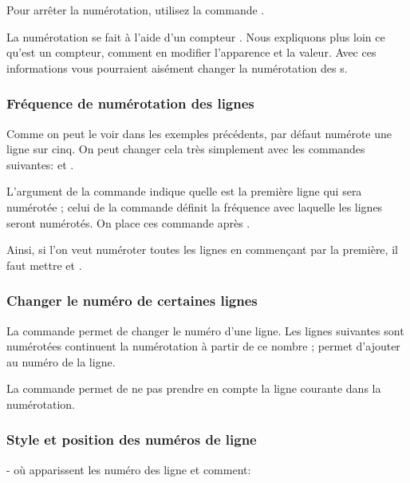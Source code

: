 Pour arrêter la numérotation,  utilisez la commande .

\begin{plusloins}
La numérotation se fait à l'aide d'un compteur . Nous expliquons plus loin ce qu'est un compteur, comment en modifier l'apparence et la valeur. Avec ces informations vous pourraient aisément changer la numérotation des s.
\end{plusloins}

\subsubsection{Fréquence de numérotation des lignes}

Comme on peut le voir dans les exemples précédents, par défaut  numérote  une ligne sur cinq. On peut changer cela très simplement avec les commandes suivantes:
 et .

L'argument  de la commande  indique quelle est  la première ligne qui sera numérotée ; celui de la commande  définit la fréquence avec laquelle les lignes seront numérotés. On place ces commande après . 

Ainsi, si l'on veut numéroter toutes les lignes en commençant par la première, il faut mettre  et . 




\subsubsection{Changer le numéro de certaines lignes}

La commande  permet de changer le numéro d'une ligne. Les lignes suivantes sont numérotées continuent la numérotation à partir de ce nombre ;  permet d'ajouter  au numéro de la ligne.

La commande  permet de ne pas prendre en compte la ligne courante dans la numérotation.

\subsubsection{Style et position des numéros de ligne}
- où apparissent les numéro des ligne et comment: %


